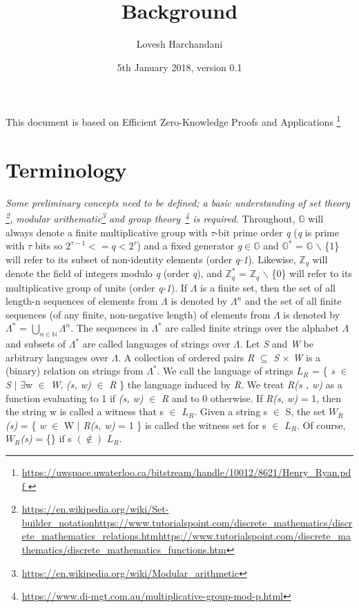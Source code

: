 \documentclass[a4paper]{article}
\title{Background}
\author{Lovesh Harchandani}
\date{5th January 2018, version 0.1}
\begin{document}
\maketitle

This document is based on Efficient Zero-Knowledge Proofs and Applications \footnote{\url{https://uwspace.uwaterloo.ca/bitstream/handle/10012/8621/Henry_Ryan.pdf
}}
 

\section{Terminology}

\textit{Some preliminary concepts need to be defined; a basic understanding of set theory \footnote{\url{https://en.wikipedia.org/wiki/Set-builder_notation}\newline \url{https://www.tutorialspoint.com/discrete_mathematics/discrete_mathematics_relations.htm}\newline \url{https://www.tutorialspoint.com/discrete_mathematics/discrete_mathematics_functions.htm}}, modular arithematic\footnote{\url{https://en.wikipedia.org/wiki/Modular_arithmetic}} and group theory~\footnote{\url{https://www.di-mgt.com.au/multiplicative-group-mod-p.html}} is required.} 
\newline
Throughout, $\mathbb{G}$ will always denote a finite multiplicative group with \(\tau\)-bit prime order \emph{q} (\emph{q} is prime with \(\tau\) bits so $ 2^{\tau - 1} <= q < 2^{\tau} $) and a fixed generator \emph{g}\(\in\)$\mathbb{G}$ and $\mathbb{G}^{*}$ = $\mathbb{G}$ \ensuremath{\backslash} \{1\} will refer to its subset of non-identity elements (order \emph{q-1}). Likewise, $\mathbb{Z}_q$ will denote the field of integers modulo \emph{q} (order \emph{q}), and $\mathbb{Z}^{*}_q$ = $\mathbb{Z}_q$ \ensuremath{\backslash} \{0\} will refer to its multiplicative group of units (order \emph{q-1}).
\newline
\newline
If \(\Lambda\) is a finite set, then the set of all length-n sequences of elements from \(\Lambda\) is denoted by \(\Lambda^n\) and the set of all finite sequences (of any finite, non-negative length) of elements from \(\Lambda\) is denoted by \(\Lambda^{*}\) = \( \bigcup_{n\in\mathbb{N}} \)\(\Lambda^n\). The sequences in \(\Lambda^{*}\) are called finite strings over the alphabet \(\Lambda\) and subsets of \(\Lambda^{*}\) are called languages of strings over \(\Lambda\). Let \textit{S} and \textit{W} be arbitrary languages over \(\Lambda\). A collection of ordered pairs \textit{R} \(\subseteq\) \textit{S} \(\times\) \textit{W} is a (binary) relation on strings from \(\Lambda^{*}\). We call the language of strings \textit{$L_R$} {=} \{ \textit{s} $\in$ \textit{S} \(\mid\) \(\exists\)w $\in$ \textit{W}, \textit{(s, w)} $\in$ \textit{R} \} the language induced by \textit{R}. We treat \textit{R(s , w)} as a function evaluating to 1 if \textit{(s, w)} $\in$ \textit{R} and to 0 otherwise. If \textit{R(s, w)} = 1, then the string w is called a witness that s $\in$ \textit{$L_R$}. Given a string s $\in$ S, the set \textit{$W_R$(s)} = \{ \textit{w} $\in$ W $\mid$ \textit{R(s, w)} = 1 \}  is called the witness set for s $\in$ \textit{$L_R$}. Of course, \textit{$W_R$(s)} = \{\} if s $(\notin)$ \textit{$L_R$}.
\end{document}
